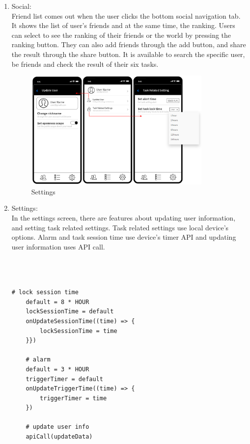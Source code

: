 \documentclass[conference]{IEEEtran}
\begin{document}
\begin{enumerate}
    \item Social: \\
    Friend list comes out when the user clicks the bottom social navigation tab. It shows the list of user's friends and at the same time, the ranking. Users can select to see the ranking of their friends or the world by pressing the ranking button. They can also add friends through the add button, and share the result through the share button. It is available to search the specific user, be friends and check the result of their six tasks.
    
\begin{figure}[htp] \centering \includegraphics[width=260pt]{5) Settings.PNG} \caption{Settings} \label{fig:Settings} \end{figure}    
    
    \item Settings: \\
    In the settings screen, there are features about updating user information, and setting task related settings. Task related settings use local device's options. Alarm and task session time use device's timer API and updating user information uses API call.\\ \\ \\ \\
    \begin{lstlisting}[frame=single]
    # lock session time
    default = 8 * HOUR
    lockSessionTime = default
    onUpdateSessionTime((time) => {
        lockSessionTime = time
    }})
    
    # alarm
    default = 3 * HOUR
    triggerTimer = default
    onUpdateTriggerTime((time) => {
        triggerTimer = time
    })
    
    # update user info
    apiCall(updateData)
    \end{lstlisting}

\end{enumerate}
\end{document}
